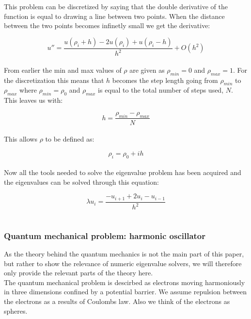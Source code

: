 \documentclass{article}
\begin{document}
This problem can be discretized by saying that the double derivative of the function is equal to drawing a line between two points. When the distance between the two points becomes infinetly small we get the derivative:

\begin{equation}  \label{eq:doublederivativeu}
  u'' = \frac{u(\rho_i + h) - 2u(\rho_i) + u(\rho_i-h)}{h^2} + O(h^2)
\end{equation} \\

From earlier the min and max values of $\rho$ are given as $\rho_{min} = 0$ and $\rho_{max} = 1$. For the discretization this means that $h$ becomes the step length going from $\rho_{min}$ to $\rho_{max}$ where $\rho_{min} = \rho_0$ and $\rho_{max}$ is equal to the total number of steps used, $N$. This leaves us with:

\begin{equation} \label{eq:steplength}
  h = \frac{\rho_{min} - \rho_{max}}{N}
\end{equation} \\

This allows $\rho$ to be defined as:

\begin{equation} \label{eq:rhoi}
  \rho_i = \rho_0 + ih
\end{equation} \\

Now all the tools needed to solve the eigenvalue problem has been acquired and the eigenvalues can be solved through this equation:

\begin{equation} \label{eq:lambdauiclassical}
  \lambda u_i =  \frac{-u_{i+1} + 2u_i - u_{i-1}}{h^2}
\end{equation} \\


\subsubsection{Quantum mechanical problem: harmonic oscillator}

As the theory behind the quantum mechanics is not the main part of this paper, but rather to show the relevance of numeric eigenvalue solvers, we will therefore only provide the relevant parts of the theory here. \\

The quantum mechanical problem is descirbed as electrons moving harmoniously in three dimensions confined by a potential barrier. We assume repulsion between the electrons as a results of Coulombs law. Also we think of the electrons as spheres.
\end{document}
